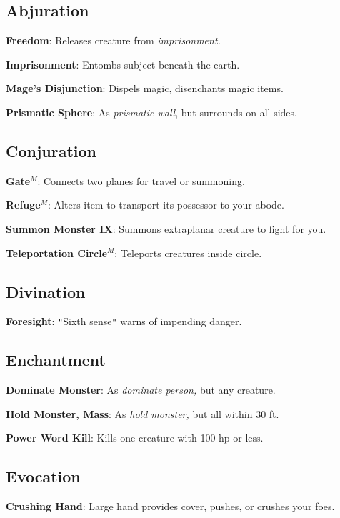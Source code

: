 \subsection{Abjuration}


\textbf{Freedom}: Releases creature from \textit{imprisonment.}

\textbf{Imprisonment}: Entombs subject beneath the earth.

\textbf{Mage's Disjunction}: Dispels magic, disenchants magic items.

\textbf{Prismatic Sphere}: As \textit{prismatic wall}, but surrounds on all sides.

\subsection{Conjuration}


\textbf{Gate}\(^{M}\): Connects two planes for travel or summoning.

\textbf{Refuge}\(^{M}\): Alters item to transport its possessor to your abode.

\textbf{Summon Monster IX}: Summons extraplanar creature to fight for you.

\textbf{Teleportation Circle}\(^{M}\): Teleports creatures inside circle.

\subsection{Divination}


\textbf{Foresight}: \texttt{{}"{}}Sixth sense\texttt{{}"{}} warns of impending danger.

\subsection{Enchantment}


\textbf{Dominate Monster}: As \textit{dominate person, }but any creature.

\textbf{Hold Monster, Mass}: As \textit{hold monster, }but all within 30 ft.

\textbf{Power Word Kill}: Kills one creature with 100 hp or less.

\subsection{Evocation}


\textbf{Crushing Hand}: Large hand provides cover, pushes, or crushes your foes.

